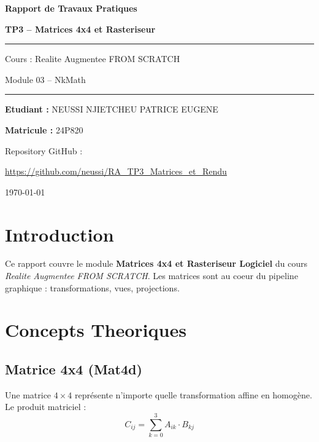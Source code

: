 \documentclass[12pt,a4paper]{article}
\begin{document}
\begin{titlepage}
    \centering
    \vspace*{2cm}
    {\huge\bfseries Rapport de Travaux Pratiques\par}
    \vspace{1cm}
    {\LARGE\bfseries\color{codeblue} TP3 -- Matrices 4x4 et Rasteriseur\par}
    \vspace{1.5cm}
    \rule{\linewidth}{0.5pt}\vspace{0.5cm}
    {\large Cours : Realite Augmentee FROM SCRATCH\par}
    {\large Module 03 -- NkMath\par}
    \vspace{0.5cm}\rule{\linewidth}{0.5pt}
    \vspace{2cm}
    {\large\textbf{Etudiant :} NEUSSI NJIETCHEU PATRICE EUGENE\par}
    {\large\textbf{Matricule :} 24P820\par}
    \vspace{2cm}
    {\large Repository GitHub :\par}
    \href{https://github.com/neussi/RA_TP3_Matrices_et_Rendu}{https://github.com/neussi/RA\_TP3\_Matrices\_et\_Rendu}
    \vfill
    {\large \today\par}
\end{titlepage}

\tableofcontents
\newpage

\section{Introduction}

Ce rapport couvre le module \textbf{Matrices 4x4 et Rasteriseur Logiciel} du cours
\textit{Realite Augmentee FROM SCRATCH}. Les matrices sont au coeur du pipeline graphique :
transformations, vues, projections.

\section{Concepts Theoriques}

\subsection{Matrice 4x4 (Mat4d)}

Une matrice $4\times4$ repr\'esente n'importe quelle transformation affine en homog\`ene.
Le produit matriciel :
\[
    C_{ij} = \sum_{k=0}^{3} A_{ik} \cdot B_{kj}
\]
\end{document}
